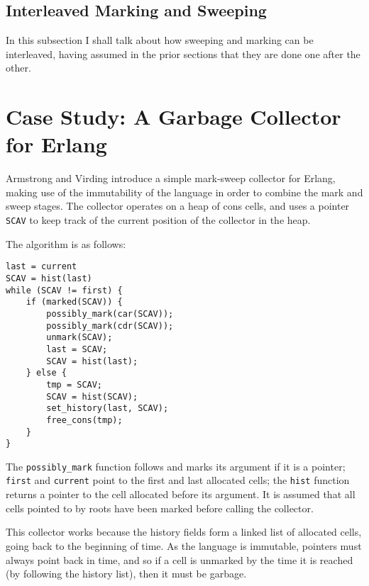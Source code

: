 
\subsection{Interleaved Marking and Sweeping}


In this subsection I shall talk about how sweeping and marking can be
interleaved, having assumed in the prior sections that they are done
one after the other.

\section{Case Study: A Garbage Collector for Erlang}

Armstrong and Virding\cite{Armstrong95} introduce a simple
\gls{mark-sweep} \gls{collector} for Erlang, making use of the
immutability of the language in order to combine the mark and sweep
stages. The \gls{collector} operates on a \gls{heap} of cons cells,
and uses a \gls{pointer} \texttt{SCAV} to keep track of the current
position of the \gls{collector} in the heap.

The algorithm is as follows:

\begin{lstlisting}
last = current
SCAV = hist(last)
while (SCAV != first) {
    if (marked(SCAV)) {
        possibly_mark(car(SCAV));
        possibly_mark(cdr(SCAV));
        unmark(SCAV);
        last = SCAV;
        SCAV = hist(last);
    } else {
        tmp = SCAV;
        SCAV = hist(SCAV);
        set_history(last, SCAV);
        free_cons(tmp);
    }
}
\end{lstlisting}


The \texttt{possibly\_mark} function follows and marks its argument if
it is a pointer; \texttt{first} and \texttt{current} point to the
first and last allocated \glspl{cell}; the \texttt{hist} function
returns a \gls{pointer} to the \gls{cell} allocated before its
argument. It is assumed that all cells pointed to by roots have been
marked before calling the collector.

This \gls{collector} works because the history fields form a linked
list of allocated cells, going back to the beginning of time. As the
language is immutable, pointers must always point back in time, and so
if a cell is unmarked by the time it is reached (by following the
history list), then it must be garbage.

